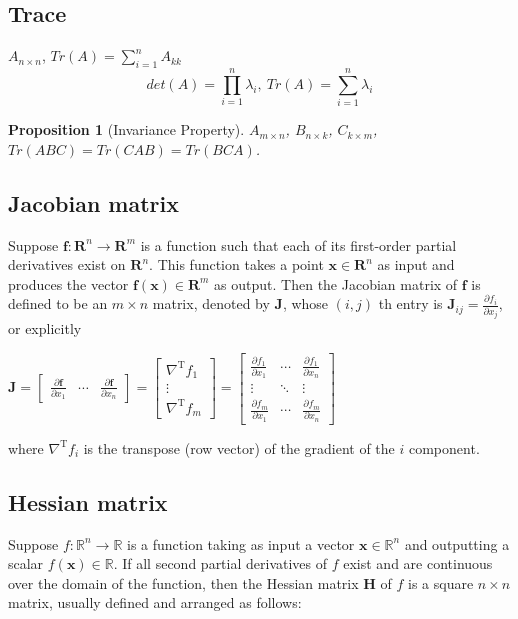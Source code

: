 \documentclass[11pt,a4paper]{article}
\newtheorem{proposition}{Proposition}
\begin{document}
\subsection{Trace}
$A_{n\times n}$, $Tr(A)=\sum_{i=1}^nA_{kk}$
$$det(A)=\prod_{i=1}^n\lambda_i,\ Tr(A)=\sum_{i=1}^n\lambda_i$$
\begin{proposition}[Invariance Property]
$A_{m\times n}$, $B_{n\times k}$, $C_{k\times m}$, $Tr(ABC)=Tr(CAB)=Tr(BCA)$.
\end{proposition}






\subsection{Jacobian matrix}
Suppose $\mathbf{f}: \mathbf{R}^{n} \rightarrow \mathbf{R}^{m}$ is a function such that each of its first-order partial derivatives exist on $\mathbf{R}^{n} .$ This function takes a point $\mathbf{x} \in \mathbf{R}^{n}$ as input and produces the vector $\mathbf{f}(\mathbf{x}) \in \mathbf{R}^{m}$ as output. Then the Jacobian matrix of $\mathbf{f}$ is defined to be an $m \times n$ matrix, denoted by $\mathbf{J}$, whose $(i, j)$ th entry is $\mathbf{J}_{i j}=\frac{\partial f_{i}}{\partial x_{j}}$, or explicitly

$
\mathbf{J}=\left[\begin{array}{ccc}
\frac{\partial \mathbf{f}}{\partial x_{1}} & \cdots & \frac{\partial \mathbf{f}}{\partial x_{n}}
\end{array}\right]=\left[\begin{array}{c}
\nabla^{\mathrm{T}} f_{1} \\
\vdots \\
\nabla^{\mathrm{T}} f_{m}
\end{array}\right]=\left[\begin{array}{ccc}
\frac{\partial f_{1}}{\partial x_{1}} & \cdots & \frac{\partial f_{1}}{\partial x_{n}} \\
\vdots & \ddots & \vdots \\
\frac{\partial f_{m}}{\partial x_{1}} & \cdots & \frac{\partial f_{m}}{\partial x_{n}}
\end{array}\right]
$

where $\nabla^{\mathrm{T}} f_{i}$ is the transpose (row vector) of the gradient of the $i$ component.

\subsection{Hessian matrix}
Suppose $f: \mathbb{R}^{n} \rightarrow \mathbb{R}$ is a function taking as input a vector $\mathbf{x} \in \mathbb{R}^{n}$ and outputting a scalar $f(\mathbf{x}) \in \mathbb{R}$. If all second partial derivatives of $f$ exist and are continuous over the domain of the function, then the Hessian matrix $\mathbf{H}$ of $f$ is a square $n \times n$ matrix, usually defined and arranged as follows:
\end{document}
